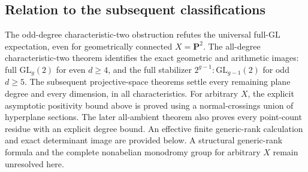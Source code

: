 \subsection{Relation to the subsequent classifications}
The odd-degree characteristic-two obstruction refutes the universal
full-$\mathrm{GL}$ expectation, even for geometrically connected
$X=\mathbf P^2$.  The all-degree characteristic-two theorem identifies
the exact geometric and arithmetic images: full $\mathrm{GL}_g(2)$
for even $d\ge4$, and the full stabilizer
$2^{g-1}\!:\mathrm{GL}_{g-1}(2)$ for odd $d\ge5$.
The subsequent projective-space theorems settle every remaining
plane degree and every dimension, in all characteristics.
For arbitrary $X$, the explicit asymptotic positivity bound above is
proved using a normal-crossings union of hyperplane sections.
The later all-ambient theorem also proves every point-count residue
with an explicit degree bound. An effective finite generic-rank
calculation and exact determinant image are provided below.
A structural generic-rank formula and the complete nonabelian
monodromy group for arbitrary $X$ remain unresolved here.
